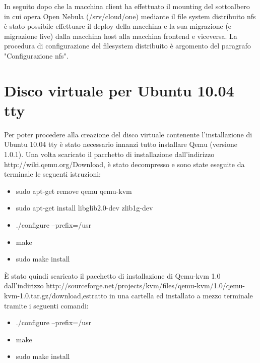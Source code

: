 \documentclass[	
	DIV=calc,
	paper=a4,
	fontsize=11pt,
	onecolumn
]{scrartcl} %
\begin{document}
In seguito dopo che la macchina client ha effettuato il mounting del sottoalbero in cui opera Open Nebula (/srv/cloud/one) mediante il file system distribuito nfs è stato possibile effettuare il deploy della macchina e la sua migrazione (e migrazione live) dalla macchina host alla macchina frontend e viceversa. La procedura di configurazione del filesystem distribuito è argomento del paragrafo "Configurazione nfs".

\section*{Disco virtuale per Ubuntu 10.04 tty}
Per poter procedere alla creazione del disco virtuale contenente l'installazione di Ubuntu 10.04 tty è stato necessario innanzi tutto installare Qemu (versione 1.0.1). Una volta scaricato il pacchetto di installazione dall'indirizzo http://wiki.qemu.org/Download, è stato decompresso e sono state eseguite da terminale le seguenti istruzioni:
\begin{itemize}
	\item sudo apt-get remove qemu qemu-kvm
	\item sudo apt-get install libglib2.0-dev zlib1g-dev
	\item ./configure --prefix=/usr
	\item make
	\item sudo make install
\end{itemize}

È stato quindi scaricato il pacchetto di installazione di Qemu-kvm 1.0 dall'indirizzo http://sourceforge.net/projects/kvm/files/qemu-kvm/1.0/qemu-kvm-1.0.tar.gz/download,estratto in una cartella ed installato a mezzo terminale tramite i seguenti comandi:
\begin{itemize}
	\item ./configure --prefix=/usr
	\item make
	\item sudo make install
\end{itemize}
\end{document}
